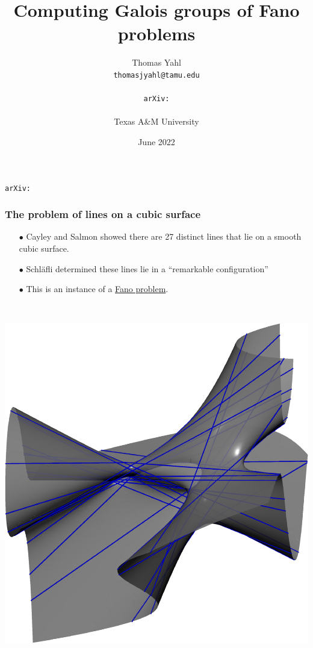 \documentclass{beamer}
\title{Computing Galois groups of Fano problems}
\author{Thomas Yahl\\  \texttt{thomasjyahl@tamu.edu}\\ \vspace{-.1cm} \\ \texttt{arXiv:}\\ \vspace{-.1cm} \\ Texas A\&M University}
\date{June 2022}
\newcommand{\blue}[1]{{\color{black!10!blue}\underline{#1}}}
\begin{document}
\begin{frame}
\titlepage

\texttt{arXiv:}
\end{frame}


\begin{frame}
\frametitle{The problem of lines on a cubic surface}
\hspace{-.8cm}
\begin{minipage}{.55\textwidth}
\begin{enumerate}
\item[$\bullet$] Cayley and Salmon showed there are 27 distinct lines that lie on a smooth cubic surface.

\item[$\bullet$] Schl\"{a}fli determined these lines lie in a ``remarkable configuration'' 

\item[$\bullet$] This is an instance of a \blue{Fano problem}.
\end{enumerate}
\end{minipage}
%
\begin{minipage}{.02\textwidth}
~
\end{minipage}
%
\begin{minipage}{.4\textwidth}
\begin{center}
\includegraphics[scale=.32]{figures/27lines.pdf}
\end{center}
\end{minipage}


\end{frame}
\end{document}
